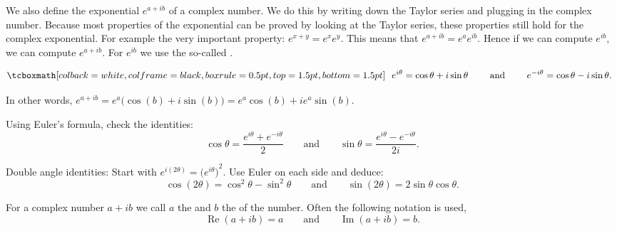 \pagebreak[2]
We also define the exponential $e^{a+ib}$ of a complex number.  We do
this by writing down the Taylor series and plugging in the complex
number.  Because most properties of the exponential can be proved by looking
at the Taylor series, these
properties still hold for the complex
exponential.  For example the very important property: $e^{x+y} = e^x e^y$.  This means that
$e^{a+ib} = e^a e^{ib}$.  Hence if we can compute $e^{ib}$, we can
compute $e^{a+ib}$.  For $e^{ib}$ we use the so-called
\emph{}.

\begin{theorem} \label{eulersformula}
\begin{equation*}
\mybxbg{~~
e^{i \theta} = \cos \theta + i \sin \theta
\qquad \text{ and } \qquad
e^{- i \theta} = \cos \theta - i \sin \theta .
~~}
\end{equation*}
\end{theorem}

In other words, $e^{a+ib} = e^a \bigl( \cos(b) + i \sin(b) \bigr) = e^a \cos(b) + i e^a \sin(b)$.

\begin{exercise}
Using Euler's formula, check the identities:
\begin{equation*}
\cos \theta = \frac{e^{i \theta} + e^{-i \theta}}{2}
\qquad \text{and} \qquad
\sin \theta = \frac{e^{i \theta} - e^{-i \theta}}{2i}.
\end{equation*}
\end{exercise}

\begin{exercise}
Double angle identities:
Start with $e^{i(2\theta)} = {\bigl(e^{i \theta} \bigr)}^2$.  Use Euler on
each side and deduce:
\begin{equation*}
\cos (2\theta) = \cos^2 \theta - \sin^2 \theta
\qquad \text{and} \qquad
\sin (2\theta) = 2 \sin \theta \cos \theta .
\end{equation*}
\end{exercise}

For a complex number $a+ib$ we call
$a$ the \emph{} and $b$ the \emph{} of the number.
Often the following notation is used,
\begin{equation*}
\operatorname{Re}(a+ib) = a
\qquad \text{and} \qquad
\operatorname{Im}(a+ib) = b.
\end{equation*}

